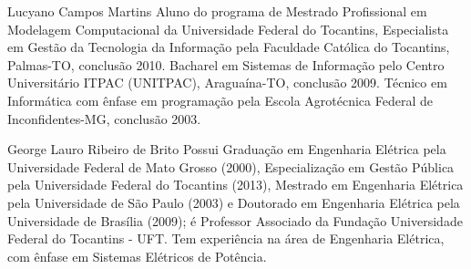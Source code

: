 \documentclass[journal]{IEEEtran}
\begin{document}



\begin{IEEEbiography}
{Lucyano Campos Martins}
Aluno do programa de Mestrado Profissional em Modelagem Computacional da Universidade Federal do Tocantins, Especialista em Gestão da Tecnologia da Informação pela Faculdade Católica do Tocantins, Palmas-TO, conclusão 2010. Bacharel em Sistemas de Informação pelo Centro Universitário ITPAC (UNITPAC), Araguaína-TO, conclusão 2009. Técnico em Informática com ênfase em programação pela Escola Agrotécnica Federal de Inconfidentes-MG, conclusão 2003.
\end{IEEEbiography}

\begin{IEEEbiography}
{George Lauro Ribeiro de Brito}
Possui Graduação em Engenharia Elétrica pela Universidade Federal de Mato Grosso (2000), Especialização em Gestão Pública pela Universidade Federal do Tocantins (2013), Mestrado em Engenharia Elétrica pela Universidade de São Paulo (2003) e Doutorado em Engenharia Elétrica pela Universidade de Brasília (2009); é Professor Associado da Fundação Universidade Federal do Tocantins - UFT. Tem experiência na área de Engenharia Elétrica, com ênfase em Sistemas Elétricos de Potência.
\end{IEEEbiography}
\end{document}
